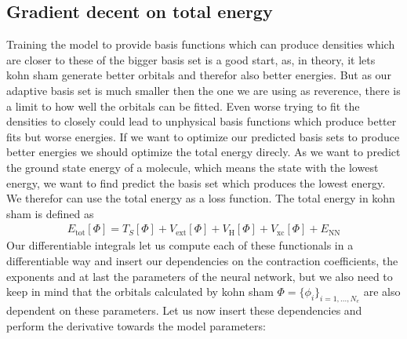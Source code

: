 \subsection{Gradient decent on total energy}
Training the model to provide basis functions which can produce densities which are closer to these of the bigger basis set is a good start, as, in theory, it lets kohn sham generate better orbitals and therefor also better energies. But as our adaptive basis set is much smaller then the one we are using as reverence, there is a limit to how well the orbitals can be fitted. Even worse trying to fit the densities to closely could lead to unphysical basis functions which produce better fits but worse energies. If we want to optimize our predicted basis sets to produce better energies we should optimize the total energy direcly. As we want to predict the ground state energy of a molecule, which means the state with the lowest energy, we want to find predict the basis set which produces the lowest energy. We therefor can use the total energy as a loss function. The total energy in kohn sham is defined as
\begin{align}
    E_{\text{tot}}[\Phi] = T_S[\Phi] + V_{\text{ext}}[\Phi] + V_{\text{H}}[\Phi] + V_{\text{xc}}[\Phi] + E_{\text{NN}}
\end{align}
Our differentiable integrals let us compute each of these functionals in a differentiable way and insert our dependencies on the contraction coefficients, the exponents and at last the parameters of the neural network, but we also need to keep in mind that the orbitals calculated by kohn sham $\Phi = \{\phi_i\}_{i=1,...,N_e}$ are also dependent on these parameters. Let us now insert these dependencies and perform the derivative towards the model parameters:

